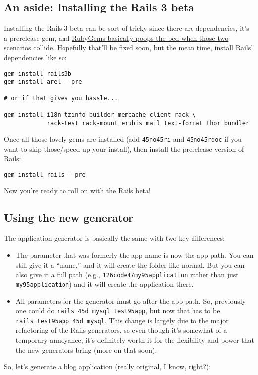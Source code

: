 \documentclass{book}
\begin{document}
\hypertarget{an_aside_installing_the_rails_3_beta}{}\subsection*{{An aside: Installing the Rails 3 beta}}\label{an_aside_installing_the_rails_3_beta}

Installing the Rails 3 beta can be sort of tricky since there are dependencies, it'{}s a prerelease gem, and \href{http://twitter.com/bitsweat/status/8662035599}{RubyGems basically poops the bed when those two scenarios collide}. Hopefully that'{}ll be fixed soon, but the mean time, install Rails'{} dependencies like so:

\begin{verbatim}gem install rails3b
gem install arel --pre

# or if that gives you hassle...

gem install i18n tzinfo builder memcache-client rack \
            rack-test rack-mount erubis mail text-format thor bundler\end{verbatim}
Once all those lovely gems are installed (add {\colorbox[rgb]{0.87,0.87,0.87}{\tt {}\char45no\char45ri}} and {\colorbox[rgb]{0.87,0.87,0.87}{\tt {}\char45no\char45rdoc}} if you want to skip those/speed up your install), then install the prerelease version of Rails:

\begin{verbatim}gem install rails --pre\end{verbatim}
Now you'{}re ready to roll on with the Rails beta!

\hypertarget{using_the_new_generator}{}\subsection*{{Using the new generator}}\label{using_the_new_generator}

The application generator is basically the same with two key differences:

\begin{itemize}%
\item The parameter that was formerly the app name is now the app path. You can still give it a ``{}name,''{} and it will create the folder like normal. But you can also give it a full path (e.g., {\colorbox[rgb]{0.87,0.87,0.87}{\tt \char126code\char47my\char95application}} rather than just {\colorbox[rgb]{0.87,0.87,0.87}{\tt my\char95application}}) and it will create the application there.
\item All parameters for the generator must go after the app path. So, previously one could do {\colorbox[rgb]{0.87,0.87,0.87}{\tt rails~\char45d~mysql~test\char95app}}, but now that has to be {\colorbox[rgb]{0.87,0.87,0.87}{\tt rails~test\char95app~\char45d~mysql}}. This change is largely due to the major refactoring of the Rails generators, so even though it'{}s somewhat of a temporary annoyance, it'{}s definitely worth it for the flexibility and power that the new generators bring (more on that soon).

\end{itemize}
So, let'{}s generate a blog application (really original, I know, right?):
\end{document}

